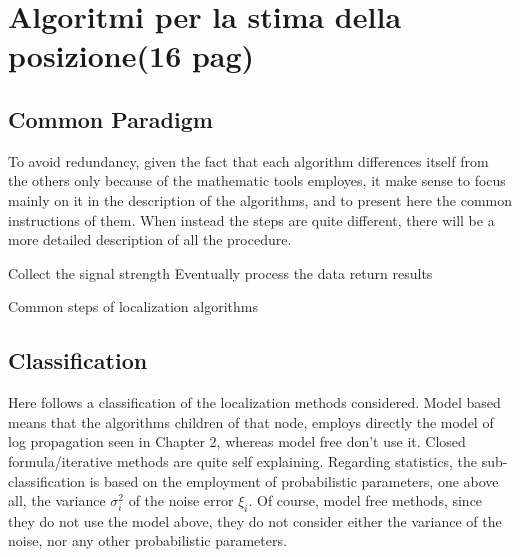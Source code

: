 \documentclass[12pt,twoside]{report}
\begin{document}
\clearpage

\chapter{Algoritmi per la stima della posizione(16 pag)}
\section{Common Paradigm}
To avoid redundancy, given the fact that each algorithm differences itself from the others only because of the mathematic tools employes, it make sense to focus mainly on it in the description of the algorithms, and to present here the common instructions of them.
When instead the steps are quite different, there will be a more detailed description of all the procedure.

\begin{algorithm}[H]
\SetAlgoLined
Collect the signal strength\;
Eventually process the data\;
return results\;
 \caption{Common steps of localization algorithms}
\end{algorithm}

\section{Classification}
Here follows a classification of the localization methods considered. Model based means that the algorithms children of that node, employs directly the model of log propagation seen in Chapter 2, whereas model free don't use it. Closed formula/iterative methods are quite self explaining. Regarding statistics, the sub-classification is based on the employment of probabilistic parameters, one above all, the variance $\sigma^2_i$ of the noise error $\xi_i$. Of course, model free methods, since they do not use the model above, they do not consider either the variance of the noise, nor any other probabilistic parameters.

\begin{figure}
\end{figure}
\end{document}
